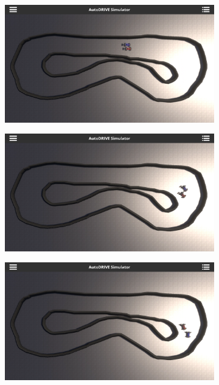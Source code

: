 \documentclass[letterpaper, 10 pt, conference]{ieeeconf}  %
\begin{document}
\begin{figure}[t]
     \centering
     \begin{subfigure}[b]{0.16\linewidth}
         \centering
         \includegraphics[width=\linewidth]{Fig10a.png}
         \caption{}
         \label{fig10a}
     \end{subfigure}
     \hfill
     \begin{subfigure}[b]{0.16\linewidth}
         \centering
         \includegraphics[width=\linewidth]{Fig10b.png}
         \caption{}
         \label{fig10b}
     \end{subfigure}
     \hfill
     \begin{subfigure}[b]{0.16\linewidth}
         \centering
         \includegraphics[width=\linewidth]{Fig10c.png}

\end{subfigure}
\end{figure}
\end{document}
